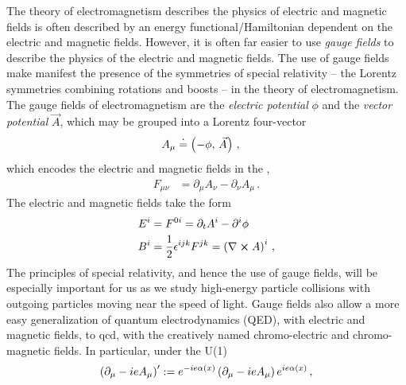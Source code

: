 

The theory of electromagnetism describes the physics of electric and magnetic fields is often described by an energy functional/Hamiltonian dependent on the electric and magnetic fields.
%
However, it is often far easier to use \textit{gauge fields} to describe the physics of the electric and magnetic fields.
%
The use of gauge fields make manifest the presence of the symmetries of special relativity -- the Lorentz symmetries combining rotations and boosts -- in the theory of electromagnetism.
%
The gauge fields of electromagnetism are the \textit{electric potential} \(\phi\) and the \textit{vector potential} \(\vec{A}\), which may be grouped into a Lorentz four-vector
\begin{align}
    A_\mu &\overset{\boldsymbol{\cdot}}{=} \left(-\phi, \, \vec{A}\right)
    \,,
\end{align}
which encodes the electric and magnetic fields in the ,
\begin{align}
    F_{\mu\nu} &= \partial_\mu A_\nu - \partial_\nu A_\mu
    \,.
\end{align}
%
The electric and magnetic fields take the form
\begin{align}
    E^i &= F^{0i} = \partial_t A^i - \partial^i \phi
    \\
    B^i
    &=
    {\frac{1}{2}} \epsilon^{ijk} F^{jk}
    =
    \left(\nabla \cross A\right)^i
    \,,
\end{align}
%
The principles of special relativity, and hence the use of gauge fields, will be especially important for us as we study high-energy particle collisions with outgoing particles moving near the speed of light.
%
Gauge fields also allow a more easy generalization of quantum electrodynamics (QED), with electric and magnetic fields, to \gls{qcd}, with the creatively named chromo-electric and chromo-magnetic fields.
%
In particular, under the U(1) 
\begin{align}
    \left(\partial_\mu - i e A_\mu\right)^\prime
    :=
    e^{-i e \alpha(x)}
    \left(\partial_\mu - i e A_\mu\right)
    e^{i e \alpha(x)}
    \,,
\end{align}
